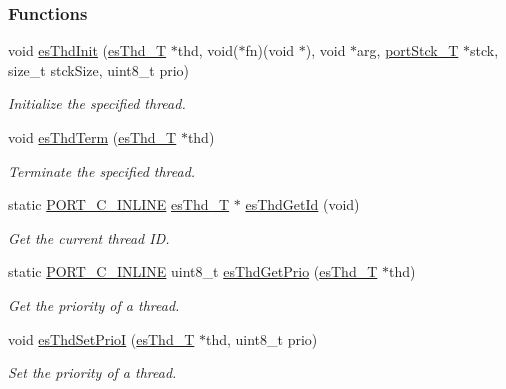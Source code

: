\subsubsection*{Functions}
\begin{DoxyCompactItemize}
\item 
void \hyperlink{group__kern__thd_gac91734f3ee867b519f59bf81cc7fde88}{es\-Thd\-Init} (\hyperlink{group__kern__thd_ga62e3a3ca0a4597a19c43cb8868810d82}{es\-Thd\-\_\-\-T} $\ast$thd, void($\ast$fn)(void $\ast$), void $\ast$arg, \hyperlink{group__template__cpu__intf_ga13cc91970e3e05fe4210440c068d3f4a}{port\-Stck\-\_\-\-T} $\ast$stck, size\-\_\-t stck\-Size, uint8\-\_\-t prio)
\begin{DoxyCompactList}\small\item\em Initialize the specified thread. \end{DoxyCompactList}\item 
void \hyperlink{group__kern__thd_gac9d1eac76f26096614e8196bcfd8b905}{es\-Thd\-Term} (\hyperlink{group__kern__thd_ga62e3a3ca0a4597a19c43cb8868810d82}{es\-Thd\-\_\-\-T} $\ast$thd)
\begin{DoxyCompactList}\small\item\em Terminate the specified thread. \end{DoxyCompactList}\item 
static \hyperlink{group__template__compiler_ga87952d6e574c7f437503926e833ba345}{P\-O\-R\-T\-\_\-\-C\-\_\-\-I\-N\-L\-I\-N\-E} \hyperlink{group__kern__thd_ga62e3a3ca0a4597a19c43cb8868810d82}{es\-Thd\-\_\-\-T} $\ast$ \hyperlink{group__kern__thd_gae2a2c5fe0128d446a64512b0714bfb6d}{es\-Thd\-Get\-Id} (void)
\begin{DoxyCompactList}\small\item\em Get the current thread I\-D. \end{DoxyCompactList}\item 
static \hyperlink{group__template__compiler_ga87952d6e574c7f437503926e833ba345}{P\-O\-R\-T\-\_\-\-C\-\_\-\-I\-N\-L\-I\-N\-E} uint8\-\_\-t \hyperlink{group__kern__thd_ga6d2d033dc7e1226eccf4a51c666678ad}{es\-Thd\-Get\-Prio} (\hyperlink{group__kern__thd_ga62e3a3ca0a4597a19c43cb8868810d82}{es\-Thd\-\_\-\-T} $\ast$thd)
\begin{DoxyCompactList}\small\item\em Get the priority of a thread. \end{DoxyCompactList}\item 
void \hyperlink{group__kern__thd_ga8eaa731d0026a8a1667d4422d5031df6}{es\-Thd\-Set\-Prio\-I} (\hyperlink{group__kern__thd_ga62e3a3ca0a4597a19c43cb8868810d82}{es\-Thd\-\_\-\-T} $\ast$thd, uint8\-\_\-t prio)
\begin{DoxyCompactList}\small\item\em Set the priority of a thread. \end{DoxyCompactList}\end{DoxyCompactItemize}


